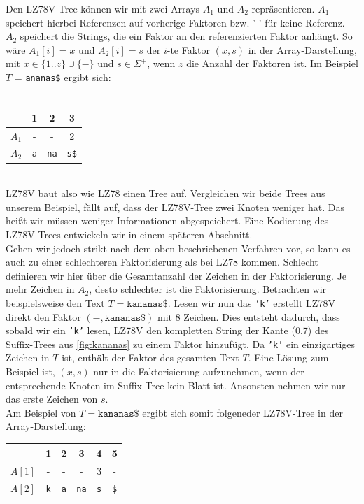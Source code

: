 \documentclass[a4paper,11pt]{scrartcl}%
\theoremstyle{change}
\theoremstyle{nonumberplain}
\theoremstyle{change}
\theoremstyle{nonumberplain}
\theoremstyle{change}
\theoremstyle{nonumberplain}
\begin{document}
	Den LZ78V-Tree können wir mit zwei Arrays $A_1$ und $A_2$ repräsentieren. $A_1$ speichert hierbei Referenzen auf vorherige Faktoren bzw. '-' für keine Referenz. $A_2$ speichert die Strings, die ein Faktor an den referenzierten Faktor anhängt. So wäre $A_1[i] = x$ und $A_2[i] = s$ der $i$-te Faktor $(x,s)$ in der Array-Darstellung, mit $x \in \{1..z\} \cup \{-\}$ und $ s \in \Sigma^+$, wenn $z$ die Anzahl der Faktoren ist. Im Beispiel $T$ = \texttt{ananas\$} ergibt sich:\\\\
	\begin{tabular}{l c c c}
						\hline
							& 1 & 2 & 3 \\\hline
						$A_1$ & - & - & 2 \\\hline
						$A_2$	& \texttt{a} & \texttt{na} & \texttt{s\$}\\\hline
						
			
	\end{tabular}\\
	
	
LZ78V baut also wie LZ78 einen Tree auf. Vergleichen wir beide Trees aus unserem Beispiel, fällt auf, dass der LZ78V-Tree zwei Knoten weniger hat. Das heißt wir müssen weniger Informationen abgespeichert. Eine Kodierung des LZ78V-Trees entwickeln wir in einem späteren Abschnitt.\\
Gehen wir jedoch strikt nach dem oben beschriebenen Verfahren vor, so kann es auch zu einer schlechteren Faktorisierung als bei LZ78 kommen. Schlecht definieren wir hier über die Gesamtanzahl der Zeichen in der Faktorisierung. Je mehr Zeichen in $A_2$, desto schlechter ist die Faktorisierung. Betrachten wir beispielsweise den Text $T = \texttt{kananas\$}$. Lesen wir nun das \texttt{'k'} erstellt LZ78V direkt den Faktor $(-, \texttt{kananas\$})$ mit 8 Zeichen. Dies entsteht dadurch, dass sobald wir ein \texttt{'k'} lesen, LZ78V den kompletten String der Kante (0,7) des Suffix-Trees aus \autoref{fig:kananas} zu einem Faktor hinzufügt. Da \texttt{'k'} ein einzigartiges Zeichen in $T$ ist, enthält der Faktor des gesamten Text $T$. Eine Lösung zum Beispiel ist, $(x,s)$ nur in die Faktorisierung aufzunehmen, wenn der entsprechende Knoten im Suffix-Tree kein Blatt ist. Ansonsten nehmen wir nur das erste Zeichen von $s$.\\ Am Beispiel von $T = \texttt{kananas\$}$ ergibt sich somit folgeneder LZ78V-Tree in der Array-Darstellung:\\

\begin{tabular}{l c c c c c}
						\hline
							& 1 & 2 & 3 & 4 & 5\\\hline
						$A[1]$ & - & - & - & 3 & -\\\hline
						$A[2]$	& \texttt{k} & \texttt{a} & \texttt{na} & \texttt{s} & \texttt{\$}\\\hline
						
			
\end{tabular}\\
\end{document}
